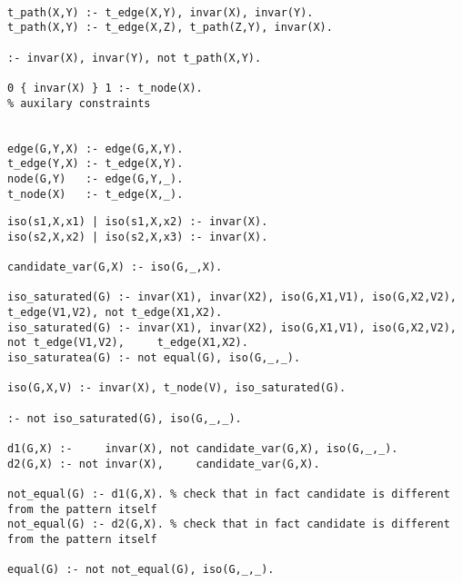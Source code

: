 \begin{lstlisting}[caption=ASP auxilary predicates, style=model]
%selects subpattern

t_path(X,Y) :- t_edge(X,Y), invar(X), invar(Y).
t_path(X,Y) :- t_edge(X,Z), t_path(Z,Y), invar(X).

:- invar(X), invar(Y), not t_path(X,Y).

0 { invar(X) } 1 :- t_node(X).
% auxilary constraints


edge(G,Y,X) :- edge(G,X,Y).
t_edge(Y,X) :- t_edge(X,Y).
node(G,Y)   :- edge(G,Y,_).
t_node(X)   :- t_edge(X,_).
\end{lstlisting}

\begin{lstlisting}[caption=ASP canonicity previous solution isomorphism check, style=model]
iso(s1,X,x1) | iso(s1,X,x2) :- invar(X).
iso(s2,X,x2) | iso(s2,X,x3) :- invar(X).

candidate_var(G,X) :- iso(G,_,X).

iso_saturated(G) :- invar(X1), invar(X2), iso(G,X1,V1), iso(G,X2,V2),     t_edge(V1,V2), not t_edge(X1,X2). 
iso_saturated(G) :- invar(X1), invar(X2), iso(G,X1,V1), iso(G,X2,V2), not t_edge(V1,V2),     t_edge(X1,X2). 
iso_saturatea(G) :- not equal(G), iso(G,_,_). 

iso(G,X,V) :- invar(X), t_node(V), iso_saturated(G).

:- not iso_saturated(G), iso(G,_,_).

d1(G,X) :-     invar(X), not candidate_var(G,X), iso(G,_,_).
d2(G,X) :- not invar(X),     candidate_var(G,X).

not_equal(G) :- d1(G,X). % check that in fact candidate is different from the pattern itself
not_equal(G) :- d2(G,X). % check that in fact candidate is different from the pattern itself

equal(G) :- not not_equal(G), iso(G,_,_).

\end{lstlisting}

